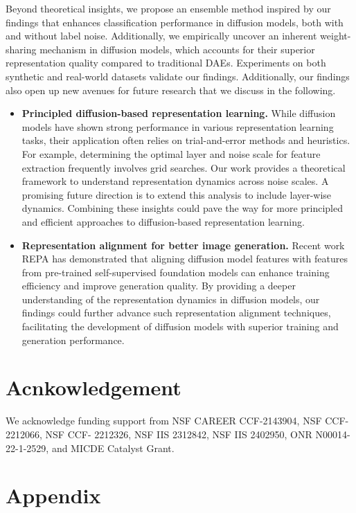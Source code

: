 \documentclass[11pt]{article}
\begin{document}
Beyond theoretical insights, we propose an ensemble method inspired by our findings that enhances classification performance in diffusion models, both with and without label noise. Additionally, we empirically uncover an inherent weight-sharing mechanism in diffusion models, which accounts for their superior representation quality compared to traditional DAEs. Experiments on both synthetic and real-world datasets validate our findings. Additionally, our findings also open up new avenues for future research that we discuss in the following.

\begin{itemize}[leftmargin=*]
    \item \textbf{Principled diffusion-based representation learning.} While diffusion models have shown strong performance in various representation learning tasks, their application often relies on trial-and-error methods and heuristics. For example, determining the optimal layer and noise scale for feature extraction frequently involves grid searches. Our work provides a theoretical framework to understand representation dynamics across noise scales. A promising future direction is to extend this analysis to include layer-wise dynamics. Combining these insights could pave the way for more principled and efficient approaches to diffusion-based representation learning.

    \item \textbf{Representation alignment for better image generation.} Recent work REPA \citet{yu2024repa} has demonstrated that aligning diffusion model features with features from pre-trained self-supervised foundation models can enhance training efficiency and improve generation quality. By providing a deeper understanding of the representation dynamics in diffusion models, our findings could further advance such representation alignment techniques, facilitating the development of diffusion models with superior training and generation performance.
\end{itemize}

\section*{Acnkowledgement}
We acknowledge funding support from NSF CAREER CCF-2143904, NSF CCF-2212066, NSF CCF-
2212326, NSF IIS 2312842, NSF IIS 2402950, ONR N00014-22-1-2529, and MICDE Catalyst Grant.




\newpage
\appendix
\section{Appendix}

\end{document}
